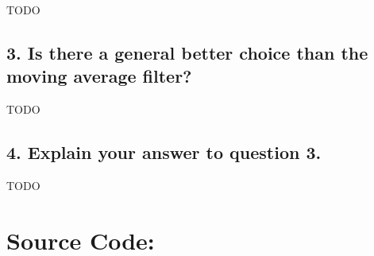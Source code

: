 \documentclass[a4paper,headings=small]{scrartcl}
\numberwithin{equation}{section} %
\numberwithin{figure}{section}   %
\begin{document}
TODO

\subsection{3. Is there a general better choice than the moving average filter?}

TODO

\subsection{4. Explain your answer to question 3.}

TODO


\newpage
\section{Source Code:}


\end{document}
